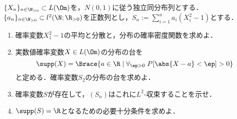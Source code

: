 \documentclass[uplatex,dvipdfmx]{jsarticle}
\begin{document}
\begin{tcolorbox}[colframe=ForestGreen, colback=ForestGreen!10!white,breakable,colbacktitle=ForestGreen!40!white,coltitle=black,fonttitle=\bfseries\sffamily,
    title=B 第13問（確率論）]
    $\{X_n\}_{n\in\N_{>0}}\subset L(\Om)$を，$N(0,1)$に従う独立同分布列とする．
    $\{a_n\}_{n\in\N_{>0}}\subset l^2(\N;\R_{>0})$を正数列とし，$S_n:=\sum_{i=1}^na_i(X_i^2-1)$とする．
    \begin{enumerate}
        \item 確率変数$X_1^2-1$の平均と分散と，分布の確率密度関数を求めよ．
        \item 実数値確率変数$X\in L(\Om)$の分布の台を
        \[\supp(X)=\Brace{a\in\R\mid\forall_{\ep>0}\;P[\abs{X-a}<\ep]>0}\]
        と定める．確率変数$S_2$の分布の台を求めよ．
        \item 確率変数$S$が存在して，$(S_n)$はこれに$L^2$-収束することを示せ．
        \item $\supp(S)=\R$となるための必要十分条件を求めよ．
    \end{enumerate}
\end{tcolorbox}
\end{document}
